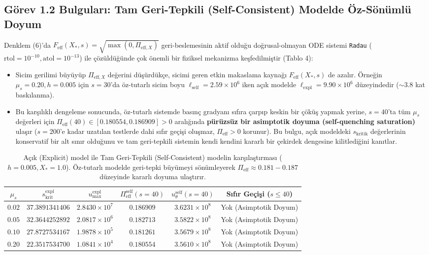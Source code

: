 \documentclass[12pt,a4paper]{article}
\begin{document}
\subsection{Görev 1.2 Bulguları: Tam Geri-Tepkili (Self-Consistent) Modelde Öz-Sönümlü Doyum}

Denklem (6)'da $F_{\mathrm{eff}}(X_*, s) = \sqrt{\max(0, \Pi_{\mathrm{eff}, X})}$ geri-beslemesinin aktif olduğu doğrusal-olmayan ODE sistemi \texttt{Radau} ($\mathrm{rtol}=10^{-10}, \mathrm{atol}=10^{-13}$) ile çözüldüğünde çok önemli bir fiziksel mekanizma keşfedilmiştir (Tablo 4):
\begin{itemize}
    \item Sicim gerilimi büyüyüp $\Pi_{\mathrm{eff}, X}$ değerini düşürdükçe, sicimi geren etkin makaslama kaynağı $F_{\mathrm{eff}}(X_*, s)$ de azalır. Örneğin $\mu_s = 0.20, h = 0.005$ için $s = 30$'da öz-tutarlı sicim boyu $\ell_{\mathrm{self}} = 2.59 \times 10^6$ iken açık modelde $\ell_{\mathrm{expl}} = 9.90 \times 10^6$ düzeyindedir ($\sim 3.8$ kat baskılanma).
    \item Bu karşılıklı dengeleme sonucunda, öz-tutarlı sistemde basınç gradyanı sıfıra çarpıp keskin bir çöküş yapmak yerine, $s = 40$'ta tüm $\mu_s$ değerleri için $\Pi_{\mathrm{eff}}(40) \in [0.180554, 0.186909] > 0$ aralığında \textbf{pürüzsüz bir asimptotik doyuma (self-quenching saturation)} ulaşır ($s=200$'e kadar uzatılan testlerde dahi sıfır geçişi oluşmaz, $\Pi_{\mathrm{eff}} > 0$ korunur). Bu bulgu, açık modeldeki $s_{\mathrm{kritik}}$ değerlerinin konservatif bir alt sınır olduğunu ve tam geri-tepkili sistemin kendi kendini kararlı bir çekirdek dengesine kilitlediğini kanıtlar.
\end{itemize}

\begin{table}[htbp]
\centering
\footnotesize
\setlength{\tabcolsep}{3pt}
\caption{Açık (Explicit) model ile Tam Geri-Tepkili (Self-Consistent) modelin karşılaştırması ($h=0.005, X_*=1.0$). Öz-tutarlı modelde geri-tepki büyümeyi sönümleyerek $\Pi_{\mathrm{eff}} \approx 0.181 - 0.187$ düzeyinde kararlı doyuma ulaştırır.}
\vspace{0.15cm}
\begin{tabular}{c|cc|ccc}
\hline
$\mu_s$ & $s_{\mathrm{krit}}^{\mathrm{expl}}$ & $u_{\max}^{\mathrm{expl}}$ & $\Pi_{\mathrm{eff}}^{\mathrm{self}}(s=40)$ & $u_\theta^{\mathrm{self}}(s=40)$ & Sıfır Geçişi ($s \le 40$) \\
\hline
$0.02$ & $37.3891341406$ & $2.8430 \times 10^{7}$ & $0.186909$ & $3.6231 \times 10^{8}$ & Yok (Asimptotik Doyum) \\
$0.05$ & $32.3644252892$ & $2.0817 \times 10^{6}$ & $0.182713$ & $3.5822 \times 10^{8}$ & Yok (Asimptotik Doyum) \\
$0.10$ & $27.8727534167$ & $1.9878 \times 10^{5}$ & $0.181261$ & $3.5679 \times 10^{8}$ & Yok (Asimptotik Doyum) \\
$0.20$ & $22.3517534700$ & $1.0841 \times 10^{4}$ & $0.180554$ & $3.5610 \times 10^{8}$ & Yok (Asimptotik Doyum) \\
\hline
\end{tabular}
\end{table}
\end{document}
